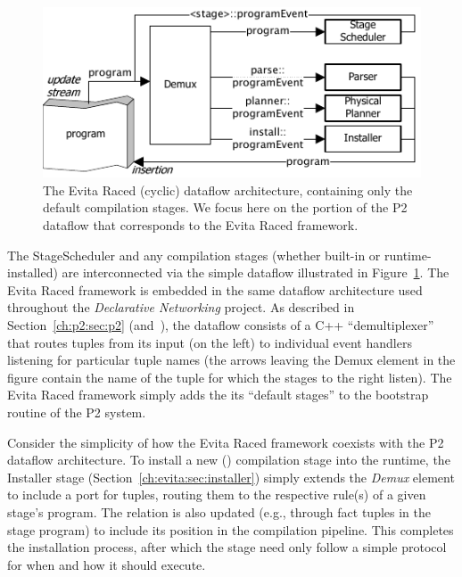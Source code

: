 \begin{figure}[htbp]
\begin{center}
\includegraphics[scale=1.5]{figures/DefaultCompiler}
\ssp
\caption{The Evita Raced (cyclic) dataflow architecture, containing only the 
default compilation stages. We focus here on the portion of the P2 dataflow
that corresponds to the Evita Raced framework.}
\label{ch:evita:fig:basecompiler}
\end{center}
\end{figure}

The StageScheduler and any compilation stages (whether built-in or
runtime-installed) are interconnected via the simple dataflow illustrated in
Figure~\ref{ch:evita:fig:basecompiler}.  The Evita Raced framework is embedded
in the same dataflow architecture used throughout the {\em Declarative
Networking} project.  As described in Section~\ref{ch:p2:sec:p2}
(and~\cite{p2:sosp}), the dataflow consists of a C++ ``demultiplexer'' that
routes tuples from its input (on the left) to individual event handlers
listening for particular tuple names (the arrows leaving the Demux element in
the figure contain the name of the tuple for which the stages to the right
listen).  The Evita Raced framework simply adds the its ``default stages'' to
the bootstrap routine of the P2 system.

Consider the simplicity of how the Evita Raced framework coexists with the P2
dataflow architecture.  To install a new (\OVERLOG) compilation stage into the
runtime, the Installer stage (Section~\ref{ch:evita:sec:installer}) simply extends
the {\em Demux} element to include a port for 
tuples, routing them to the respective rule(s) of a given stage's \OVERLOG
program. The  relation is also updated (e.g., through fact tuples
in the \OVERLOG stage program) to include its position in the compilation pipeline.
This completes the installation process, after which the \OVERLOG stage need only 
follow a simple protocol for when and how it should execute. 

